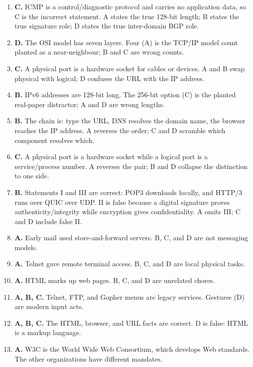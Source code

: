 \begin{enumerate}[label=\textbf{Q\arabic*.}, leftmargin=*]
  server is IMAP, so D is the NOT-correct statement. A, B, and C each state
  their service's true role.
\item \textbf{C.} ICMP is a control/diagnostic protocol and carries no
  application data, so C is the incorrect statement. A states the true
  128-bit length; B states the true signature role; D states the true
  inter-domain BGP role.
\item \textbf{D.} The OSI model has seven layers. Four (A) is the TCP/IP
  model count planted as a near-neighbour; B and C are wrong counts.
\item \textbf{C.} A physical port is a hardware socket for cables or devices.
  A and B swap physical with logical; D confuses the URL with the IP
  address.
\item \textbf{B.} IPv6 addresses are 128-bit long. The 256-bit option (C) is
  the planted real-paper distractor; A and D are wrong lengths.
\item \textbf{B.} The chain is: type the URL, DNS resolves the domain name,
  the browser reaches the IP address. A reverses the order; C and D scramble
  which component resolves which.
\item \textbf{C.} A physical port is a hardware socket while a logical port
  is a service/process number. A reverses the pair; B and D collapse the
  distinction to one side.
\item \textbf{B.} Statements I and III are correct: POP3 downloads locally,
  and HTTP/3 runs over QUIC over UDP. II is false because a digital
  signature proves authenticity/integrity while encryption gives
  confidentiality. A omits III; C and D include false II.

\item \textbf{A.} Early mail used store-and-forward servers. B, C, and D are not messaging models.
\item \textbf{A.} Telnet gave remote terminal access. B, C, and D are local physical tasks.
\item \textbf{A.} HTML marks up web pages. B, C, and D are unrelated chores.
\item \textbf{A, B, C.} Telnet, FTP, and Gopher menus are legacy services. Gestures (D) are modern input acts.
\item \textbf{A, B, C.} The HTML, browser, and URL facts are correct. D is false: HTML is a markup language.
\item \textbf{A.} W3C is the World Wide Web Consortium, which develops Web standards. The other organizations have different mandates.


\end{enumerate}
